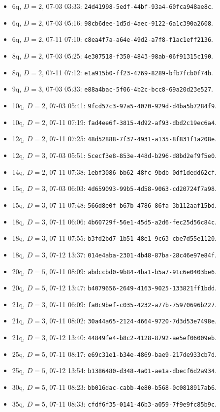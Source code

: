 \begin{itemize}
\item 6q, $D=2$, 07-03 03:33: \texttt{24d41998-5edf-44bf-93a4-60fca948ae8c}.
\item 6q, $D=2$, 07-03 05:16: \texttt{98cb6dee-1d5d-4aec-9122-6a1c390a2608}.
\item 6q, $D=2$, 07-11 07:10: \texttt{c8ea4f7a-a64e-49d2-a7f8-f1ac1eff2136}.
\item 8q, $D=2$, 07-03 05:25: \texttt{4e307518-f350-4843-98ab-06f91315c190}.
\item 8q, $D=2$, 07-11 07:12: \texttt{e1a915b0-ff23-4769-8289-bfb7fcb0f74b}.
\item 9q, $D=3$, 07-03 05:33: \texttt{e88a4bac-5f06-4b2c-bcc8-69a20d23e527}.
\item 10q, $D=2$, 07-03 05:41: \texttt{9fcd57c3-97a5-4070-929d-d4ba5b7284f9}.
\item 10q, $D=2$, 07-11 07:19: \texttt{fad4ee6f-3815-4d92-af93-dbd2c19ec6a4}.
\item 12q, $D=2$, 07-11 07:25: \texttt{48d52888-7f37-4931-a135-8f831f1a208e}.
\item 12q, $D=3$, 07-03 05:51: \texttt{5cecf3e8-853e-448d-b296-d8bd2ef9f5e0}.
\item 14q, $D=2$, 07-11 07:38: \texttt{1ebf3086-bb62-48fc-9bdb-0df1dedd62cf}.
\item 15q, $D=3$, 07-03 06:03: \texttt{4d659093-99b5-4d58-9063-cd20724f7a98}.
\item 15q, $D=3$, 07-11 07:48: \texttt{566d8e0f-b67b-4786-86fa-3b112aaf15bd}.
\item 18q, $D=3$, 07-11 06:06: \texttt{4b60729f-56e1-45d5-a2d6-fec25d56c84c}.
\item 18q, $D=3$, 07-11 07:55: \texttt{b3fd2bd7-1b51-48e1-9c63-cbe7d55e1120}.
\item 18q, $D=3$, 07-12 13:37: \texttt{014e4aba-2301-4b48-87ba-28c46e97e84f}.
\item 20q, $D=5$, 07-11 08:09: \texttt{abdccbd0-9b84-4ba1-b5a7-91c6e0403be6}.
\item 20q, $D=5$, 07-12 13:47: \texttt{b4079656-2649-4163-9025-133821ff1bdd}.
\item 21q, $D=3$, 07-11 06:09: \texttt{fa0c9bef-c035-4232-a77b-75970696b227}.
\item 21q, $D=3$, 07-11 08:02: \texttt{30a44a65-2124-4664-9720-7d3d53e7498e}.
\item 21q, $D=3$, 07-12 13:40: \texttt{44849fe4-b8c2-4128-8792-ae5ef06009eb}.
\item 25q, $D=5$, 07-11 08:17: \texttt{e69c31e1-b34e-4869-bae9-217de933cb7d}.
\item 25q, $D=5$, 07-12 13:54: \texttt{b1386480-d348-4a01-ae1a-dbecf6d2a934}.
\item 30q, $D=5$, 07-11 08:23: \texttt{bb016dac-cabb-4e80-b568-0c0818917ab6}.
\item 35q, $D=5$, 07-11 08:33: \texttt{cfdf6f35-0141-46b3-a059-7f9e9fc85b9c}.
\end{itemize}

